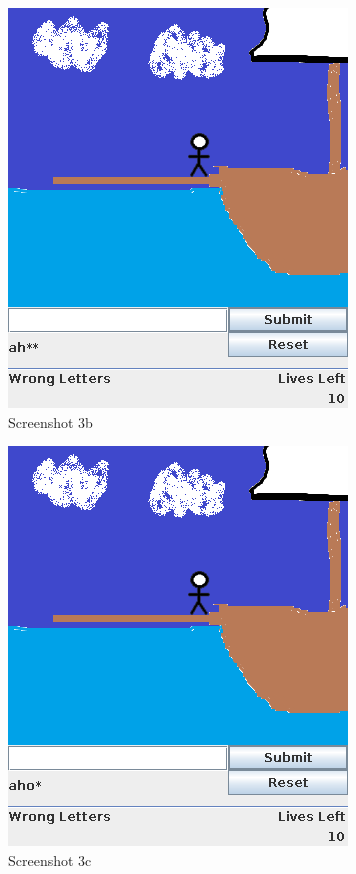 \documentclass[notitlepage]{report}
\begin{document}
\begin{multicols}{2}
\begin{figure}[H]
\centering
\includegraphics[scale=0.5]{TestScreenshots/3b}
\caption{Screenshot 3b}
\end{figure}

\begin{figure}[H]
\centering
\includegraphics[scale=0.5]{TestScreenshots/3c}
\caption{Screenshot 3c}
\end{figure}


\end{multicols}
\end{document}
